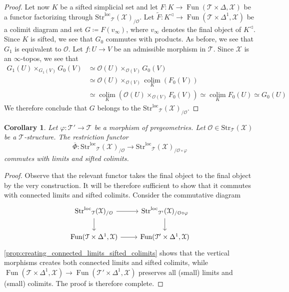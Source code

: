 \documentclass[12pt,a4paper,reqno]{amsart}
\theoremstyle{plain}
\newtheorem{cor}[thm]{Corollary}
\theoremstyle{definition}
\theoremstyle{remark}
\numberwithin{equation}{section}
\begin{document}
\begin{proof}
	Let now $K$ be a sifted simplicial set and let $F \colon K \to \operatorname{Fun}({\mathcal T} \times \Delta, {\mathcal X})$ be a functor factorizing through ${\mathrm{Str}^\mathrm{loc}}_{\mathcal T}({\mathcal X})_{/ {\mathcal O}}$.
	Let $\widetilde{F} \colon K^\triangleleft \to \operatorname{Fun}({\mathcal T} \times \Delta^1, {\mathcal X})$ be a colimit diagram and set $G \coloneqq F(v_\infty)$, where $v_\infty$ denotes the final object of $K^\triangleleft$.
	Since $K$ is sifted, we see that $G_0$ commutes with products. As before, we see that $G_1$ is equivalent to ${\mathcal O}$.
	Let $f \colon U \to V$ be an admissible morphism in ${\mathcal T}$. Since ${\mathcal X}$ is an $\infty$-topos, we see that
	\begin{align*}
	G_1(U) \times_{G_1(V)} G_0(V) & \simeq {\mathcal O}(U) \times_{{\mathcal O}(V)} G_0(V) \\
	& \simeq {\mathcal O}(U) \times_{{\mathcal O}(V)} \operatorname*{colim}_{K} (F_0(V)) \\
	& \simeq \operatorname*{colim}_K ( {\mathcal O}(U) \times_{{\mathcal O}(V)} F_0(V) ) \simeq \operatorname*{colim}_K F_0(U) \simeq G_0(U)
	\end{align*}
	We therefore conclude that $G$ belongs to the ${\mathrm{Str}^\mathrm{loc}}_{\mathcal T}({\mathcal X})_{/{\mathcal O}}$.
\end{proof}

\begin{cor} \label{cor:Phi_limits_sifted_colimits}
	Let $\varphi \colon {\mathcal T}' \to {\mathcal T}$ be a morphism of pregeometries.
	Let ${\mathcal O} \in {\mathrm{Str}}_{\mathcal T}({\mathcal X})$ be a ${\mathcal T}$-structure.
	The restriction functor
	\[ \overline{\Phi} \colon {\mathrm{Str}^\mathrm{loc}}_{\mathcal T}({\mathcal X})_{/{\mathcal O}} \to {\mathrm{Str}^\mathrm{loc}}_{\mathcal T}({\mathcal X})_{/{\mathcal O} \circ \varphi} \]
	commutes with limits and sifted colimits.
\end{cor}

\begin{proof}
	Observe that the relevant functor takes the final object to the final object by the very construction. It will be therefore sufficient to show that it commutes with connected limits and sifted colimits.
	Consider the commutative diagram
	\[ \begin{tikzcd}
	{\mathrm{Str}^\mathrm{loc}}_{\mathcal T}({\mathcal X})_{/{\mathcal O}} \arrow{r} \arrow{d} & {\mathrm{Str}^\mathrm{loc}}_{{\mathcal T}'}({\mathcal X})_{/{\mathcal O} \circ \varphi} \arrow{d} \\
	\operatorname{Fun}({\mathcal T} \times \Delta^1, {\mathcal X}) \arrow{r} & \operatorname{Fun}({\mathcal T}' \times \Delta^1, {\mathcal X})
	\end{tikzcd} \]
	\cref{prop:creating_connected_limits_sifted_colimits} shows that the vertical morphisms creates both connected limits and sifted colimits, while $\operatorname{Fun}({\mathcal T} \times \Delta^1, {\mathcal X}) \to \operatorname{Fun}({\mathcal T}' \times \Delta^1 , {\mathcal X})$ preserves all (small) limits and (small) colimits.
	The proof is therefore complete.
\end{proof}
\end{document}
